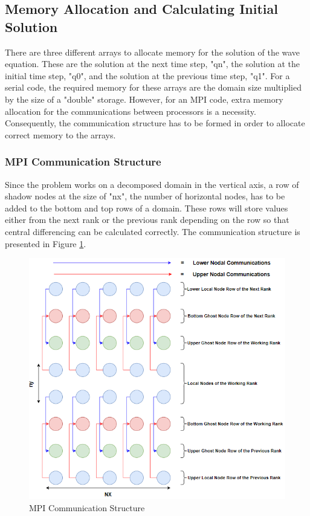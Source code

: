 \documentclass[12pt]{article}
\begin{document}
\subsection{Memory Allocation and Calculating Initial Solution}
There are three different arrays to allocate memory for the solution of the wave equation. These are the solution at the next time step, "qn", the solution at the initial time step, "q0", and the solution at the previous time step, "q1". For a serial code, the required memory for these arrays are the domain size multiplied by the size of a "double" storage. However, for an MPI code, extra memory allocation for the communications between processors is a necessity. Consequently, the communication structure has to be formed in order to allocate correct memory to the arrays.
\subsubsection{MPI Communication Structure}
Since the problem works on a decomposed domain in the vertical axis, a row of shadow nodes at the size of "nx", the number of horizontal nodes, has to be added to the bottom and top rows of a domain. These rows will store values either from the next rank or the previous rank depending on the row so that central differencing can be calculated correctly. The communication structure is presented in Figure \ref{comms}.
\begin{figure}[H]
    \centering
    \includegraphics[scale=0.75]{hw5_comms_structure.png}
    \caption{MPI Communication Structure}
    \label{comms}
\end{figure}
\end{document}
